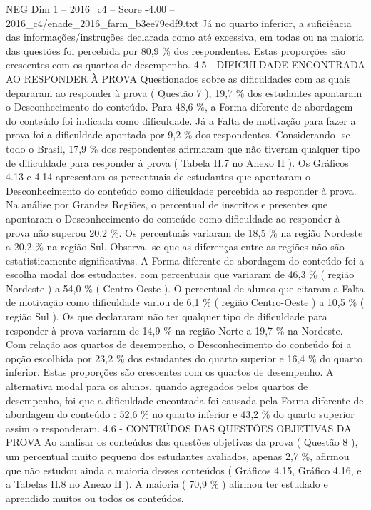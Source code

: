\begin{textsample}{NEG Dim 1 – 2016\_c4 – Score -4.00 – 2016\_c4/enade\_2016\_farm\_b3ee79edf9.txt}
Já no quarto inferior, a suficiência das informações/instruções declarada como até excessiva, em todas ou na maioria das questões foi percebida por 80,9 \% dos respondentes.
Estas proporções são crescentes com os quartos de desempenho. 4.5 - DIFICULDADE ENCONTRADA AO RESPONDER À PROVA Questionados sobre as dificuldades com as quais depararam ao responder à prova ( Questão 7 ), 19,7 \% dos estudantes apontaram o Desconhecimento do conteúdo.
Para 48,6 \%, a Forma diferente de abordagem do conteúdo foi indicada como dificuldade.
Já a Falta de motivação para fazer a prova foi a dificuldade apontada por 9,2 \% dos respondentes.
Considerando -se todo o Brasil, 17,9 \% dos respondentes afirmaram que não tiveram qualquer tipo de dificuldade para responder à prova ( Tabela II.7 no Anexo II ).
Os Gráficos 4.13 e 4.14 apresentam os percentuais de estudantes que apontaram o Desconhecimento do conteúdo como dificuldade percebida ao responder à prova.
Na análise por Grandes Regiões, o percentual de inscritos e presentes que apontaram o Desconhecimento do conteúdo como dificuldade ao responder à prova não superou 20,2 \%.
Os percentuais variaram de 18,5 \% na região Nordeste a 20,2 \% na região Sul.
Observa -se que as diferenças entre as regiões não são estatisticamente significativas.
A Forma diferente de abordagem do conteúdo foi a escolha modal dos estudantes, com percentuais que variaram de 46,3 \% ( região Nordeste ) a 54,0 \% ( Centro-Oeste ).
O percentual de alunos que citaram a Falta de motivação como dificuldade variou de 6,1 \% ( região Centro-Oeste ) a 10,5 \% ( região Sul ).
Os que declararam não ter qualquer tipo de dificuldade para responder à prova variaram de 14,9 \% na região Norte a 19,7 \% na Nordeste.
Com relação aos quartos de desempenho, o Desconhecimento do conteúdo foi a opção escolhida por 23,2 \% dos estudantes do quarto superior e 16,4 \% do quarto inferior.
Estas proporções são crescentes com os quartos de desempenho.
A alternativa modal para os alunos, quando agregados pelos quartos de desempenho, foi que a dificuldade encontrada foi causada pela Forma diferente de abordagem do conteúdo : 52,6 \% no quarto inferior e 43,2 \% do quarto superior assim o responderam. 4.6 - CONTEÚDOS DAS QUESTÕES OBJETIVAS DA PROVA Ao analisar os conteúdos das questões objetivas da prova ( Questão 8 ), um percentual muito pequeno dos estudantes avaliados, apenas 2,7 \%, afirmou que não estudou ainda a maioria desses conteúdos ( Gráficos 4.15, Gráfico 4.16, e a Tabelas II.8 no Anexo II ).
A maioria ( 70,9 \% ) afirmou ter estudado e aprendido muitos ou todos os conteúdos.

\end{textsample}
